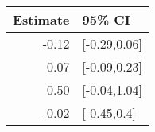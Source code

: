 \begin{tabular}{rl}
  \hline
Estimate & 95\% CI \\ 
  \hline
-0.12 & [-0.29,0.06] \\ 
  0.07 & [-0.09,0.23] \\ 
  0.50 & [-0.04,1.04] \\ 
  -0.02 & [-0.45,0.4] \\ 
   \hline
\end{tabular}

